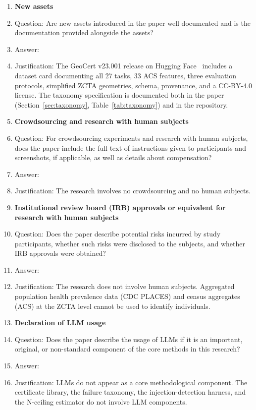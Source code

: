 \begin{enumerate}
\item {\bf New assets}
    \item[] Question: Are new assets introduced in the paper well documented and is the documentation provided alongside the assets?
    \item[] Answer: \answerYes{}
    \item[] Justification: The GeoCert v23.001 release on Hugging Face~\citep{geocert2026} includes a dataset card documenting all 27 tasks, 33 ACS features, three evaluation protocols, simplified ZCTA geometries, schema, provenance, and a CC-BY-4.0 license. The taxonomy specification is documented both in the paper (Section~\ref{sec:taxonomy}, Table~\ref{tab:taxonomy}) and in the repository.

\item {\bf Crowdsourcing and research with human subjects}
    \item[] Question: For crowdsourcing experiments and research with human subjects, does the paper include the full text of instructions given to participants and screenshots, if applicable, as well as details about compensation?
    \item[] Answer: \answerNA{}
    \item[] Justification: The research involves no crowdsourcing and no human subjects.

\item {\bf Institutional review board (IRB) approvals or equivalent for research with human subjects}
    \item[] Question: Does the paper describe potential risks incurred by study participants, whether such risks were disclosed to the subjects, and whether IRB approvals were obtained?
    \item[] Answer: \answerNA{}
    \item[] Justification: The research does not involve human subjects. Aggregated population health prevalence data (CDC PLACES) and census aggregates (ACS) at the ZCTA level cannot be used to identify individuals.

\item {\bf Declaration of LLM usage}
    \item[] Question: Does the paper describe the usage of LLMs if it is an important, original, or non-standard component of the core methods in this research?
    \item[] Answer: \answerNA{}
    \item[] Justification: LLMs do not appear as a core methodological component. The certificate library, the failure taxonomy, the injection-detection harness, and the N-ceiling estimator do not involve LLM components.

\end{enumerate}
